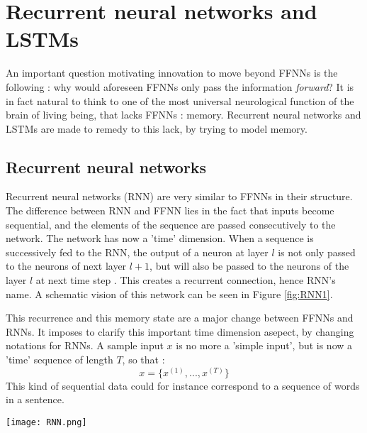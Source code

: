 \documentclass{article}
\begin{document}
\newpage






































\section{Recurrent neural networks and LSTMs}

An important question motivating innovation to move beyond FFNNs is the 
following : why would aforeseen FFNNs only pass the information \textit{forward}?
It is in fact natural to think to one of the most universal neurological function 
of the brain of living being, that lacks FFNNs : memory. Recurrent neural networks 
and LSTMs are made to remedy to this lack, by trying to model memory. 


\subsection{Recurrent neural networks}

Recurrent neural networks (RNN) are very similar to FFNNs in their structure.
The difference between 
RNN and  FFNN lies in the fact that inputs become sequential, and the elements of the sequence
are passed consecutively to the network. The network has now a 'time' dimension. When a sequence is 
successively fed to the RNN, 
the output of a neuron at layer $l$ is not only passed to the neurons of 
next layer $l+1$, but will also be passed to the neurons of the layer $l$ at next time step .
 This creates a recurrent connection, hence RNN's name. 
A schematic vision of this network can be seen in Figure \ref{fig:RNN1}.\\ \par 
This recurrence and this memory state are a major change between FFNNs and RNNs. It imposes to clarify
this important time dimension asepect, by changing notations for RNNs. 
A sample input $x$ is no more a 'simple input', but is now a 'time' sequence of length $T$,
 so that :
\[   x =\{x^{(1)}, ..., x^{(T)} \} \]
This kind of sequential data could for instance correspond to a sequence of words in a sentence. 
\begin{center}
    \label{fig:RNN1}
    \texttt{[image: RNN.png]}
\end{center}
\end{document}
